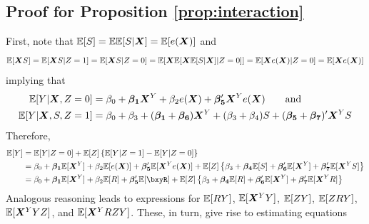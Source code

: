\documentclass[11pt]{article} %
\begin{document}
\subsection{Proof for Proposition \ref{prop:interaction}}
First, note that $\mathbb{E}[S]=\mathbb{E}\mathbb{E}[S|\bm{X}]=\mathbb{E}[e(\bm{X})]$ and
$$\mathbb{E}[\bm{X} S]=\mathbb{E}[\bm{X} S|Z=1]=\mathbb{E}[\bm{X} S|Z=0]=\mathbb{E}[\bm{X} \mathbb{E}[\bm{X}\mathbb{E}[S|\bm{X}]|Z=0]]=\mathbb{E}[\bm{X}e(\bm{X})|Z=0]=\mathbb{E}[\bm{X}e(\bm{X})]$$
implying that
\begin{equation*}
  \begin{split}
    \mathbb{E}[Y|\bm{X},Z=0]&=\beta_0+\bm{\beta_1}\bm{X}^Y+\beta_2e(\bm{X})+\bm{\beta_5}'\bm{X}^Ye(\bm{X})\tag*{and}\\
    \mathbb{E}[Y|\bm{X},S,Z=1]&=\beta_0+\beta_3+(\bm{\beta_1}+\bm{\beta_6})\bm{X}^Y+(\beta_3+\beta_4)S+(\bm{\beta_5}+\bm{\beta_7})'\bm{X}^Y S
  \end{split}
\end{equation*}
Therefore,
\begin{align*}
  \EE[Y]&=\EE[Y|Z=0]+\EE[Z]\left\{\EE[Y|Z=1]-\EE[Y|Z=0]\right\}\\
  &=\beta_0+\bm{\beta_1}\EE[\bxy]+\beta_2\EE[\pp]+\bm{\beta_5}'\EE[\bxy\pp]+\EE[Z]\left\{\beta_3+\bm{\beta_4}\EE[S]+\bm{\beta_6}'\EE[\bxy]+\bm{\beta_7}'\EE[\bxy S]\right\}\\
  &=\beta_0+\bm{\beta_1}\EE[\bxy]+\beta_2\EE[R]+\bm{\beta_5}'\EE[\bxyR]+\EE[Z]\left\{\beta_3+\bm{\beta_4}\EE[R]+\bm{\beta_6}'\EE[\bxy]+\bm{\beta_7}'\EE[\bxy R]\right\}\\
\end{align*}
Analogous reasoning leads to expressions for $\mathbb{E}[RY]$, $\mathbb{E}[\bm{X}^Y Y]$, $\mathbb{E}[ZY]$,  $\mathbb{E}[ZRY]$, $\mathbb{E}[\bm{X}^Y YZ]$, and $\mathbb{E}[\bm{X}^Y RZY]$.
These, in turn, give rise to estimating equations
\end{document}
